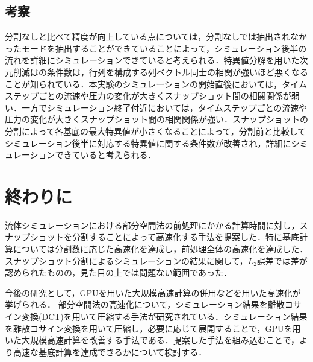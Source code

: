 \documentclass[a4j,12pt]{jreport}
\begin{document}
\section{考察}

分割なしと比べて精度が向上している点については，分割なしでは抽出されなかったモードを抽出することができていることによって，シミュレーション後半の流れを詳細にシミュレーションできていると考えられる．特異値分解を用いた次元削減はの条件数は，行列を構成する列ベクトル同士の相関が強いほど悪くなることが知られている．本実験のシミュレーションの開始直後においては，タイムステップごとの流速や圧力の変化が大きくスナップショット間の相関関係が弱い．一方でシミュレーション終了付近においては，タイムステップごとの流速や圧力の変化が大きくスナップショット間の相関関係が強い．スナップショットの分割によって各基底の最大特異値が小さくなることによって，分割前と比較してシミュレーション後半に対応する特異値に関する条件数が改善され，詳細にシミュレーションできていると考えられる．


\chapter{終わりに}
流体シミュレーションにおける部分空間法の前処理にかかる計算時間に対し，スナップショットを分割することによって高速化する手法を提案した．特に基底計算については分割数に応じた高速化を達成し，前処理全体の高速化を達成した．スナップショット分割によるシミュレーションの結果に関して，$L_2$誤差では差が認められたものの，見た目の上では問題ない範囲であった．

今後の研究として，GPUを用いた大規模高速計算の併用などを用いた高速化が挙げられる．
部分空間法の高速化について，シミュレーション結果を離散コサイン変換(DCT)を用いて圧縮する手法\cite{subspaceDCT}が研究されている．シミュレーション結果を離散コサイン変換を用いて圧縮し，必要に応じて展開することで，GPUを用いた大規模高速計算を改善する手法である．提案した手法を組み込むことで，より高速な基底計算を達成できるかについて検討する．
\end{document}
